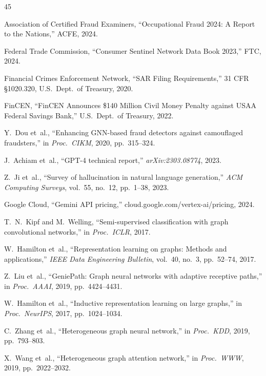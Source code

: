 \documentclass[journal]{IEEEtran}
\begin{document}
\begin{thebibliography}{45}

 Association of Certified Fraud Examiners, ``Occupational Fraud 2024: A Report to the Nations,'' ACFE, 2024.

 Federal Trade Commission, ``Consumer Sentinel Network Data Book 2023,'' FTC, 2024.

 Financial Crimes Enforcement Network, ``SAR Filing Requirements,'' 31 CFR \S1020.320, U.S.\ Dept.\ of Treasury, 2020.

 FinCEN, ``FinCEN Announces \$140 Million Civil Money Penalty against USAA Federal Savings Bank,'' U.S.\ Dept.\ of Treasury, 2022.

 Y.~Dou et~al., ``Enhancing GNN-based fraud detectors against camouflaged fraudsters,'' in \emph{Proc.\ CIKM}, 2020, pp.~315--324.

 J.~Achiam et~al., ``GPT-4 technical report,'' \emph{arXiv:2303.08774}, 2023.

 Z.~Ji et~al., ``Survey of hallucination in natural language generation,'' \emph{ACM Computing Surveys}, vol.~55, no.~12, pp.~1--38, 2023.

 Google Cloud, ``Gemini API pricing,'' cloud.google.com/vertex-ai/pricing, 2024.

 T.~N.~Kipf and M.~Welling, ``Semi-supervised classification with graph convolutional networks,'' in \emph{Proc.\ ICLR}, 2017.

 W.~Hamilton et~al., ``Representation learning on graphs: Methods and applications,'' \emph{IEEE Data Engineering Bulletin}, vol.~40, no.~3, pp.~52--74, 2017.

 Z.~Liu et~al., ``GeniePath: Graph neural networks with adaptive receptive paths,'' in \emph{Proc.\ AAAI}, 2019, pp.~4424--4431.

 W.~Hamilton et~al., ``Inductive representation learning on large graphs,'' in \emph{Proc.\ NeurIPS}, 2017, pp.~1024--1034.

 C.~Zhang et~al., ``Heterogeneous graph neural network,'' in \emph{Proc.\ KDD}, 2019, pp.~793--803.

 X.~Wang et~al., ``Heterogeneous graph attention network,'' in \emph{Proc.\ WWW}, 2019, pp.~2022--2032.


\end{thebibliography}
\end{document}
